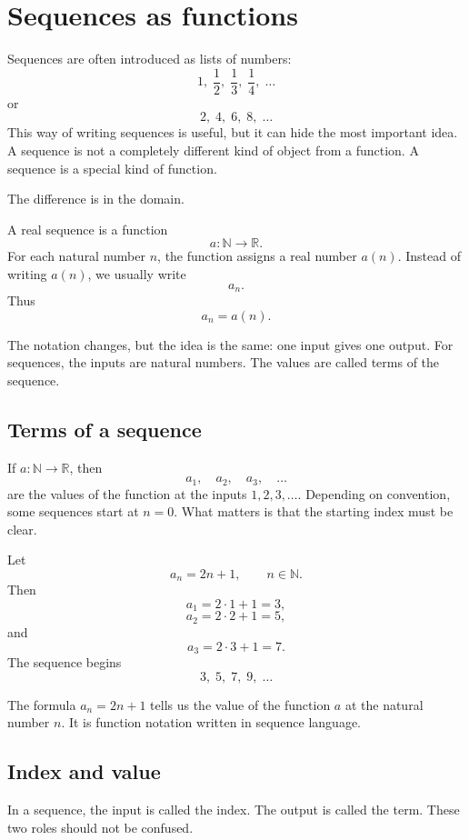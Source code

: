 \section{Sequences as functions}

Sequences are often introduced as lists of numbers:
\[
1,\; \frac12,\; \frac13,\; \frac14,\; \ldots
\]
or
\[
2,\;4,\;6,\;8,\;\ldots
\]
This way of writing sequences is useful, but it can hide the most important idea. A sequence is not a completely different kind of object from a function. A sequence is a special kind of function.

The difference is in the domain.

\begin{definitionbox}
A real sequence is a function
\[
a:\mathbb{N}\to\mathbb{R}.
\]
For each natural number \(n\), the function assigns a real number \(a(n)\). Instead of writing \(a(n)\), we usually write
\[
a_n.
\]
Thus
\[
a_n=a(n).
\]
\end{definitionbox}

The notation changes, but the idea is the same: one input gives one output. For sequences, the inputs are natural numbers. The values are called terms of the sequence.

\subsection*{Terms of a sequence}

If \(a:\mathbb{N}\to\mathbb{R}\), then
\[
a_1,
\quad
 a_2,
\quad
 a_3,
\quad \ldots
\]
are the values of the function at the inputs \(1,2,3,\ldots\). Depending on convention, some sequences start at \(n=0\). What matters is that the starting index must be clear.

\begin{examplebox}
Let
\[
a_n=2n+1,
\qquad n\in\mathbb{N}.
\]
Then
\[
a_1=2\cdot1+1=3,
\]
\[
a_2=2\cdot2+1=5,
\]
and
\[
a_3=2\cdot3+1=7.
\]
The sequence begins
\[
3,\;5,\;7,\;9,\;\ldots
\]
\end{examplebox}

The formula \(a_n=2n+1\) tells us the value of the function \(a\) at the natural number \(n\). It is function notation written in sequence language.

\subsection*{Index and value}

In a sequence, the input is called the index. The output is called the term. These two roles should not be confused.

